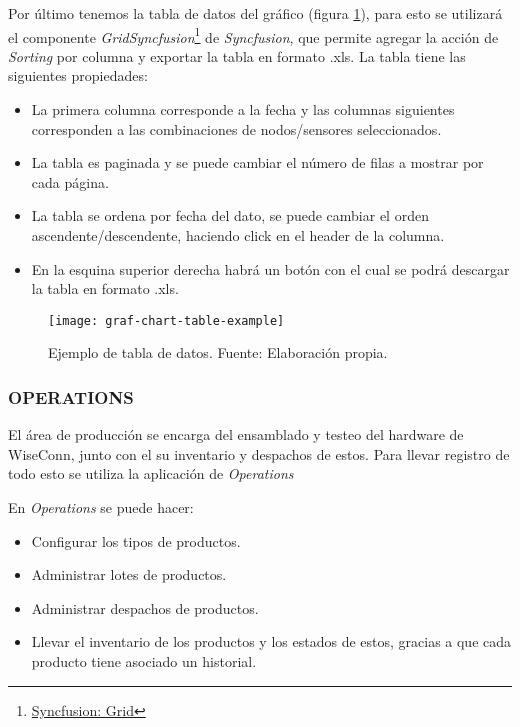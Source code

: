 Por último tenemos la tabla de datos del gráfico (figura \ref{fig:graf-chart-table-example}), para esto se utilizará el componente \textit{Grid}\textit{Syncfusion}\footnote{\href{https://ej2.syncfusion.com/react/documentation/grid/getting-started}{Syncfusion: Grid}} de \textit{Syncfusion}, que permite agregar la acción de \textit{Sorting} por columna y exportar la tabla en formato .xls.
La tabla tiene las siguientes propiedades:
\begin{itemize}
    \item La primera columna corresponde a la fecha y las columnas siguientes corresponden a las combinaciones de nodos/sensores seleccionados.
    \item La tabla es paginada y se puede cambiar el número de filas a mostrar por cada página.
    \item La tabla se ordena por fecha del dato, se puede cambiar el orden ascendente/descendente, haciendo click en el header de la columna.
    \item En la esquina superior derecha habrá un botón con el cual se podrá descargar la tabla en formato .xls.
\end{itemize}

\begin{figure}[H]
	\centering
	\texttt{[image: graf-chart-table-example]}
	\caption{\label{fig:graf-chart-table-example} Ejemplo de tabla de datos. Fuente: Elaboración propia.}
\end{figure}\fi

\subsubsection{OPERATIONS}

El área de producción se encarga del ensamblado y testeo del hardware de WiseConn, junto con el su inventario y despachos de estos. Para llevar registro de todo esto se utiliza la aplicación de \textit{Operations}

En \textit{Operations} se puede hacer:

\begin{itemize}
    \item Configurar los tipos de productos.
    \item Administrar lotes de productos.
    \item Administrar despachos de productos.
    \item Llevar el inventario de los productos y los estados de estos, gracias a que cada producto tiene asociado un historial.
\end{itemize}
\iffalse
{}

